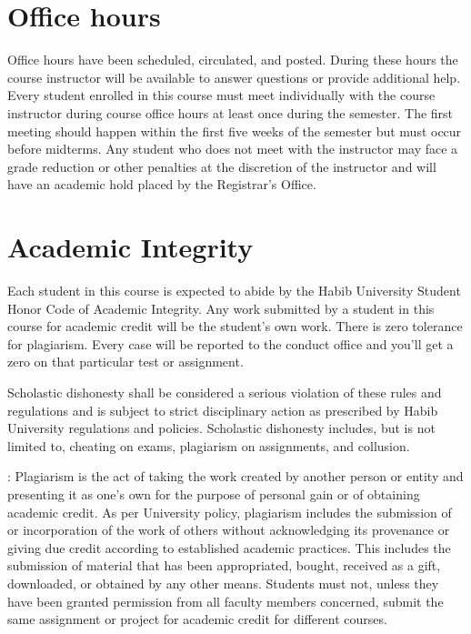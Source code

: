 \documentclass[a4paper]{article}
\begin{document}
\section{Office hours}
Office hours have been scheduled, circulated, and posted.  During these hours the course instructor will be available to answer questions or provide additional help. Every student enrolled in this course must meet individually with the course instructor during course office hours at least once during the semester. The first meeting should happen within the first five weeks of the semester but must occur before midterms. Any student who does not meet with the instructor may face a grade reduction or other penalties at the discretion of the instructor and will have an academic hold placed by the Registrar's Office. 

\section{Academic Integrity}

Each student in this course is expected to abide by the Habib University Student Honor Code of Academic Integrity.  Any work submitted by a student in this course for academic credit will be the student's own work. There is zero tolerance for plagiarism. Every case will be reported to the conduct office and you'll get a zero on that particular test or assignment. 

Scholastic dishonesty shall be considered a serious violation of these rules and regulations and is subject to strict disciplinary action as prescribed by Habib University regulations and policies. Scholastic dishonesty includes, but is not limited to, cheating on exams, plagiarism on assignments, and collusion. 

: Plagiarism is the act of taking the work created by another person or entity and presenting it as one's own for the purpose of personal gain or of obtaining academic credit. As per University policy, plagiarism includes the submission of or incorporation of the work of others without acknowledging its provenance or giving due credit according to established academic practices. This includes the submission of material that has been appropriated, bought, received as a gift, downloaded, or obtained by any other means. Students must not, unless they have been granted permission from all faculty members concerned, submit the same assignment or project for academic credit for different courses. 
\end{document}
